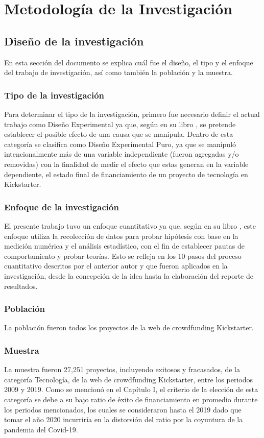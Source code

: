 \chapter{Metodología de la Investigación}
\section{Diseño de la investigación}
En esta sección del documento se explica cuál fue el diseño, el tipo y el enfoque del trabajo de investigación, así como también la población y la muestra. 

\subsection{Tipo de la investigación}
Para determinar el tipo de la investigación, primero fue necesario definir el actual trabajo como Diseño Experimental ya que, según \cite{bk_hernandez2014metodologia} en su libro , se pretende establecer el posible efecto de una causa que se manipula. Dentro de esta categoría se clasifica como Diseño Experimental Puro, ya que se manipuló intencionalmente más de una variable independiente (fueron agregadas y/o removidas) con la finalidad de medir el efecto que estas generan en la variable dependiente, el estado final de financiamiento de un proyecto de tecnología en Kickstarter.

\subsection{Enfoque de la investigación}
El presente trabajo tuvo un enfoque cuantitativo ya que, según \cite{bk_hernandez2014metodologia} en su libro , este enfoque utiliza la recolección de datos para probar hipótesis con base en la medición numérica y el análisis estadístico, con el fin de establecer pautas de comportamiento y probar teorías. Esto se refleja en los 10 pasos del proceso cuantitativo descritos por el anterior autor y que fueron aplicados en la investigación, desde la concepción de la idea hasta la elaboración del reporte de resultados.

\subsection{Población}
La población fueron todos los proyectos de la web de crowdfunding Kickstarter.

\subsection{Muestra}
La muestra fueron 27,251 proyectos, incluyendo exitosos y fracasados, de la categoría Tecnología, de la web de crowdfunding Kickstarter, entre los periodos 2009 y 2019. Como se mencionó en el Capítulo I, el criterio de la elección de esta categoría se debe a su bajo ratio de éxito de financiamiento en promedio durante los periodos mencionados, los cuales se consideraron hasta el 2019 dado que tomar el año 2020 incurriría en la distorsión del ratio por la coyuntura de la pandemia del Covid-19.

